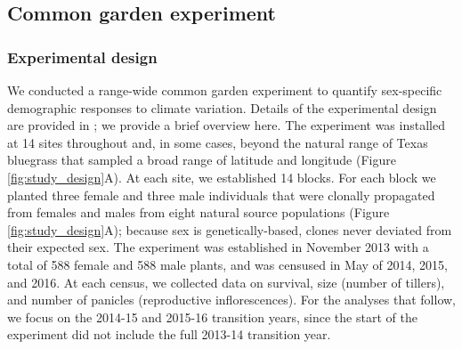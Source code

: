 \documentclass[12pt]{article}\usepackage[]{graphicx}\usepackage[dvipsnames]{xcolor}
\begin{document}
\subsection*{Common garden experiment}
\subsubsection*{Experimental design}
We conducted a range-wide common garden experiment to quantify sex-specific demographic responses to climate variation. 
Details of the experimental design are provided in \cite{miller2022two}; we provide a brief overview here. 
The experiment was installed at 14 sites throughout and, in some cases, beyond the natural range of Texas bluegrass that sampled a broad range of latitude and longitude (Figure \ref{fig:study_design}A).
At each site, we established 14 blocks. 
For each block we planted three female and three male individuals that were clonally propagated from females and males from eight natural source populations (Figure \ref{fig:study_design}A); because sex is genetically-based, clones never deviated from their expected sex. 
The experiment was established in November 2013 with a total of 588 female and 588 male plants, and was censused in May of 2014, 2015, and 2016. 
At each census, we collected data on survival, size (number of tillers), and number of panicles (reproductive inflorescences). 
For the analyses that follow, we focus on the 2014-15 and 2015-16 transition years, since the start of the experiment did not include the full 2013-14 transition year. 
\end{document}
